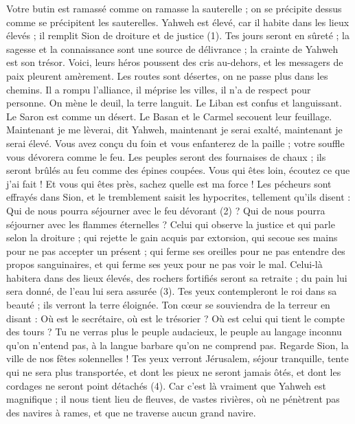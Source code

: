 \begin{multicols}{2}
Votre butin est ramassé comme on ramasse la sauterelle ; on se précipite dessus comme se précipitent les sauterelles.
Yahweh est élevé, car il habite dans les lieux élevés ; il remplit Sion de droiture et de justice (1).
Tes jours seront en sûreté ; la sagesse et la connaissance sont une source de délivrance ; la crainte de Yahweh est son trésor.
Voici, leurs héros poussent des cris au-dehors, et les messagers de paix pleurent amèrement.
Les routes sont désertes, on ne passe plus dans les chemins. Il a rompu l'alliance, il méprise les villes, il n’a de respect pour personne.
On mène le deuil, la terre languit. Le Liban est confus et languissant. Le Saron est comme un désert. Le Basan et le Carmel secouent leur feuillage.
Maintenant je me lèverai, dit Yahweh, maintenant je serai exalté, maintenant je serai élevé.
Vous avez conçu du foin et vous enfanterez de la paille ; votre souffle vous dévorera comme le feu.
Les peuples seront des fournaises de chaux ; ils seront brûlés au feu comme des épines coupées.
Vous qui êtes loin, écoutez ce que j'ai fait ! Et vous qui êtes près, sachez quelle est ma force !
Les pécheurs sont effrayés dans Sion, et le tremblement saisit les hypocrites, tellement qu'ils disent : Qui de nous pourra séjourner avec le feu dévorant (2) ? Qui de nous pourra séjourner avec les flammes éternelles ?
Celui qui observe la justice et qui parle selon la droiture ; qui rejette le gain acquis par extorsion, qui secoue ses mains pour ne pas accepter un présent ; qui ferme ses oreilles pour ne pas entendre des propos sanguinaires, et qui ferme ses yeux pour ne pas voir le mal.
Celui-là habitera dans des lieux élevés, des rochers fortifiés seront sa retraite ; du pain lui sera donné, de l’eau lui sera assurée (3).
Tes yeux contempleront le roi dans sa beauté ; ils verront la terre éloignée.
Ton cœur se souviendra de la terreur en disant : Où est le secrétaire, où est le trésorier ? Où est celui qui tient le compte des tours ?
Tu ne verras plus le peuple audacieux, le peuple au langage inconnu qu'on n'entend pas, à la langue barbare qu'on ne comprend pas.
Regarde Sion, la ville de nos fêtes solennelles ! Tes yeux verront Jérusalem, séjour tranquille, tente qui ne sera plus transportée, et dont les pieux ne seront jamais ôtés, et dont les cordages ne seront point détachés (4).
Car c'est là vraiment que Yahweh est magnifique ; il nous tient lieu de fleuves, de vastes rivières, où ne pénètrent pas des navires à rames, et que ne traverse aucun grand navire.

\end{multicols}
